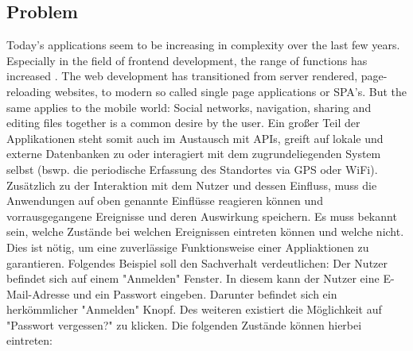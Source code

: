 \subsection{Problem}
\label{subsec:problem}

Today's applications seem to be increasing in complexity over the last few years. 
Especially in the field of frontend development, the range of functions has increased \cite{kevin2018}.
The web development has transitioned from server rendered, page-reloading websites, to modern so called single page applications or SPA's.
But the same applies to the mobile world: Social networks, navigation, sharing and editing files together is a common desire by the user.
Ein großer Teil der Applikationen steht somit auch im Austausch mit APIs, greift auf lokale und externe Datenbanken zu oder interagiert 
mit dem zugrundeliegenden System selbst (bswp. die periodische Erfassung des Standortes via GPS oder WiFi).
Zusätzlich zu der Interaktion mit dem Nutzer und dessen Einfluss, muss die Anwendungen auf oben genannte Einflüsse reagieren können 
und vorrausgegangene Ereignisse und deren Auswirkung speichern. Es muss bekannt sein, welche Zustände bei welchen Ereignissen eintreten
können und welche nicht. Dies ist nötig, um eine zuverlässige Funktionsweise einer Appliaktionen zu garantieren.
Folgendes Beispiel soll den Sachverhalt verdeutlichen:
Der Nutzer befindet sich auf einem "Anmelden" Fenster. In diesem kann der Nutzer eine E-Mail-Adresse und ein Passwort eingeben.
Darunter befindet sich ein herkömmlicher "Anmelden" Knopf. Des weiteren existiert die Möglichkeit auf "Passwort vergessen?" zu klicken.
Die folgenden Zustände können hierbei eintreten:

